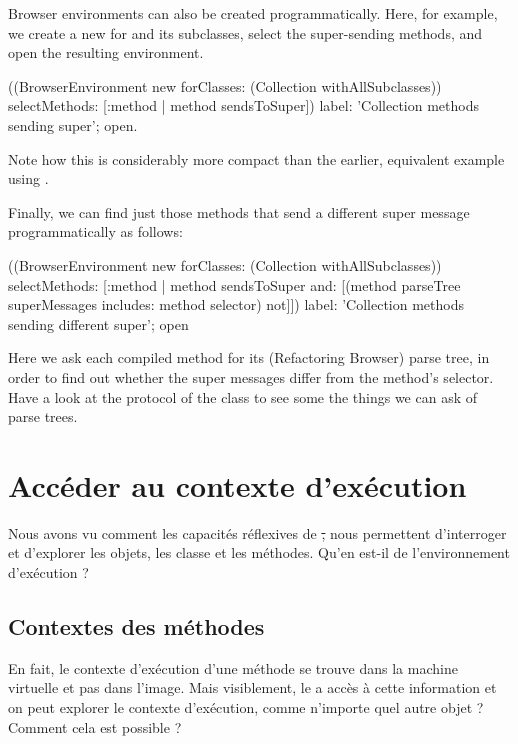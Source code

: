 \documentclass[a4paper,10pt,twoside]{book}
\begin{document}
Browser environments can also be created programmatically.
Here, for example, we create a new  for  and its subclasses, select the super-sending methods, and open the resulting environment.
\begin{code}{}
((BrowserEnvironment new forClasses: (Collection withAllSubclasses))
	selectMethods: [:method | method sendsToSuper])
	label: 'Collection methods sending super';
	open.
\end{code}{}

Note how this is considerably more compact than the earlier, equivalent example using .

Finally, we can find just those methods that send a different super message programmatically as follows:
\begin{code}{}
((BrowserEnvironment new forClasses: (Collection withAllSubclasses))
	selectMethods: [:method | 
		method sendsToSuper
		and: [(method parseTree superMessages includes: method selector) not]])
	label: 'Collection methods sending different super';
	open
\end{code}
Here we ask each compiled method for its (Refactoring Browser) parse tree, in order to find out whether the super messages differ from the method's selector.
Have a look at the  protocol of the class  to see some the things we can ask of parse trees.

\section{Accéder au contexte d'exécution}

Nous avons vu comment les capacités réflexives de \st, nous permettent d'interroger et d'explorer les objets, les classe et les méthodes. Qu'en est-il de l'environnement d'exécution ?

\subsection{Contextes des méthodes}

En fait, le contexte d'exécution d'une méthode se trouve dans la machine virtuelle et pas dans l'image. Mais visiblement, le  a accès à cette information et on peut explorer le contexte d'exécution, comme n'importe quel autre objet ? Comment cela est possible ?
\end{document}
